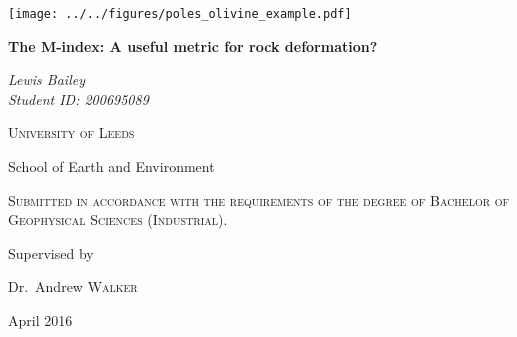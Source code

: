 \documentclass[12pt,a4paper]{report}
\begin{document}
\begin{titlepage}
	\centering
	\texttt{[image: ../../figures/poles\_olivine\_example.pdf]}\par\vspace{1cm}
    \huge{\textbf{The M-index: A useful metric for rock deformation?}}\par
    \vspace{1cm}
    {\Large \textit{Lewis Bailey\\Student ID: 200695089}\par}

	\vspace{1.5cm}


    {\scshape\LARGE{}University of Leeds\par}
    \vspace{0.5cm}
    {\small{}School of Earth and Environment \par}
	\vspace{2cm}
	{\scshape\Large Submitted in accordance with the requirements of the degree of Bachelor of Geophysical Sciences (Industrial).\par}
	\vspace{2cm}
	Supervised by\par
	Dr.~Andrew \textsc{Walker}

	\vfill

	{\large April 2016\par}
	
	\newpage\pagestyle{plain}\mbox{}\newpage
	

\end{titlepage}
\end{document}
